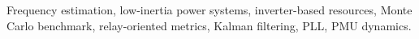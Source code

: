 \begin{IEEEkeywords}
Frequency estimation, low-inertia power systems, inverter-based resources, Monte Carlo benchmark, relay-oriented metrics, Kalman filtering, PLL, PMU dynamics.
\end{IEEEkeywords}
